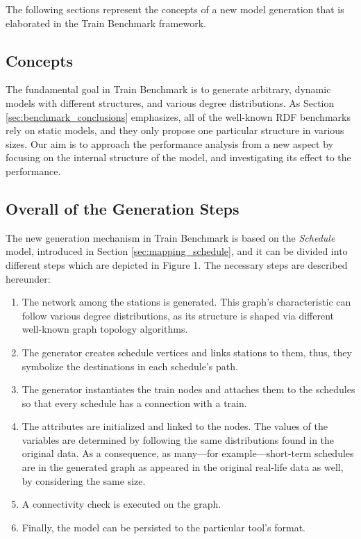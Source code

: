 The following sections represent the concepts of a new model generation that is elaborated in the Train Benchmark framework.
\subsection{Concepts}
The fundamental goal in Train Benchmark is to generate arbitrary, dynamic models with different structures, and various degree distributions. As Section \ref{sec:benchmark_conclusions} emphasizes, all of the well-known RDF benchmarks rely on static models, and they only propose one particular structure in various sizes. Our aim is to approach the performance analysis from a new aspect by focusing on the internal structure of the model, and investigating its effect to the performance.

\subsection{Overall of the Generation Steps}
The new generation mechanism in Train Benchmark is based on the \textit{Schedule} model, introduced in Section \ref{sec:mapping_schedule}, and it can be divided into different steps which are depicted in Figure 1. %
The necessary steps are described hereunder:
\begin{enumerate}
	\item The network among the stations is generated. This graph's characteristic can follow various degree distributions, as its structure is shaped via different well-known graph topology algorithms.
	\item The generator creates schedule vertices and links stations to them, thus, they symbolize the destinations in each schedule's path.
	\item The generator instantiates the train nodes and attaches them to the schedules so that every schedule has a connection with a train.
	\item The attributes are initialized and linked to the nodes. The values of the variables are determined by following the same distributions found in the original data. As a consequence, as many---for example---short-term schedules are in the generated graph as appeared in the original real-life data as well, by considering the same size.
	\item A connectivity check is executed on the graph.
	\item Finally, the model can be persisted to the particular tool's format.
\end{enumerate}

